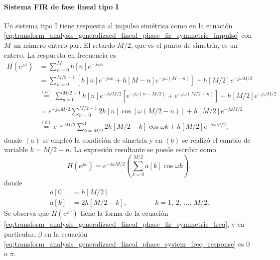 \documentclass[a4paper]{report}
\begin{document}
\paragraph{Sistema FIR de fase lineal tipo I} Un sistema tipo I tiene respuesta al impulso simétrica
como en la ecuación \ref{eq:transform_analysis_generalizaed_lineal_phase_fir_symmetric_impulse}
con \(M\) un número entero par. El retardo \(M/2\), que es el punto de simetría, es un entero. La respuesta en frecuencia es
\begin{align*}
 H(e^{j\omega})&=\sum_{n=0}^M h[n]e^{-j\omega n}\\
  &=\sum_{n=0}^{M/2-1}\left[h[n]e^{-j\omega n}+h[M-n]e^{-j\omega(M-n)}\right]+h[M/2]e^{-j\omega M/2}\\
  &\overset{(a)}{=}\sum_{n=0}^{M/2-1}h[n]e^{-j\omega M/2}\left[e^{-j\omega(n-M/2)}+e^{-j\omega(M/2-n)}\right]+h[M/2]e^{-j\omega M/2}\\
  &=e^{-j\omega M/2}\sum_{n=0}^{M/2-1}2h[n]\cos[\omega(M/2-n)]+h[M/2]e^{-j\omega M/2}\\
  &\overset{(b)}{=}e^{-j\omega M/2}\sum_{k=M/2}^1 2h[M/2-k]\cos\omega k+h[M/2]e^{-j\omega M/2},
\end{align*}
donde \((a)\) se empleó la condición de simetría y en \((b)\) se realizó el cambio de variable \(k=M/2-n\). La expresión resultante se puede escribir como
\[
 H(e^{j\omega})=e^{-j\omega M/2}\left(\sum_{k=0}^{M/2}a[k]\cos\omega k\right),
\]
donde
\begin{align*}
 a[0]&=h[M/2]\\
 a[k]&=2h[M/2-k],
 \qquad\qquad 
 k=1,\,2,\,\dots,\,M/2.
\end{align*}
Se observa que \(H(e^{j\omega})\) tiene la forma de la ecuación \ref{eq:transform_analysis_generalizaed_lineal_phase_fir_symmetric_freq}, y en particular, \(\beta\) en la ecuación \ref{eq:transform_analysis_generalizaed_lineal_phase_system_freq_response} es 0 o \(\pi\).
\end{document}
